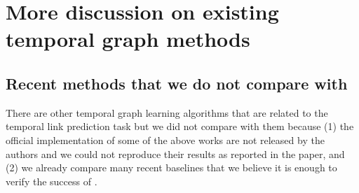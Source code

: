 

\section{More discussion on existing temporal graph methods}\label{section:other_related_work}

\subsection{Recent methods that we do not compare with}
There are other temporal graph learning algorithms that are related to the temporal link prediction task but we did not compare \our with them because (1) the official implementation of some of the above works are not released by the authors and we could not reproduce their results as reported in the paper, and (2) we already compare many recent baselines that we believe it is enough to verify the success of \oure.

